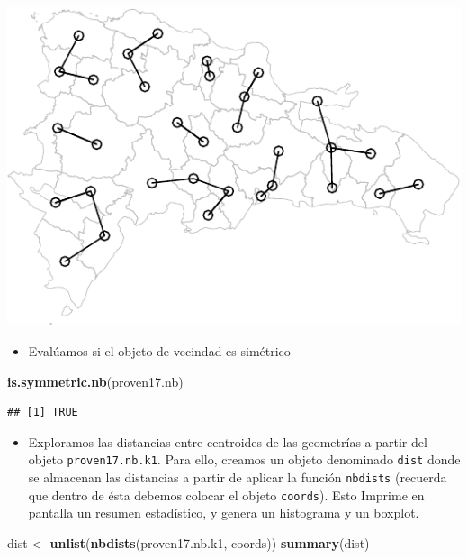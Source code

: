 \documentclass[11pt,]{article}
\newenvironment{Shaded}{\begin{snugshade}}{\end{snugshade}}
\newcommand{\KeywordTok}[1]{\textcolor[rgb]{0.13,0.29,0.53}{\textbf{#1}}}
\newcommand{\StringTok}[1]{\textcolor[rgb]{0.31,0.60,0.02}{#1}}
\newcommand{\NormalTok}[1]{#1}
\providecommand{\tightlist}{%
\setlength{\itemsep}{0pt}\setlength{\parskip}{0pt}}
\begin{document}
\includegraphics{proyecto_files/figure-latex/unnamed-chunk-14-1.pdf}

\begin{itemize}
\tightlist
\item
  Evalúamos si el objeto de vecindad es simétrico
\end{itemize}

\begin{Shaded}
\begin{Highlighting}[]
\KeywordTok{is.symmetric.nb}\NormalTok{(proven17.nb)}
\end{Highlighting}
\end{Shaded}

\begin{verbatim}
## [1] TRUE
\end{verbatim}

\begin{itemize}
\tightlist
\item
  Exploramos las distancias entre centroides de las geometrías a partir
  del objeto \texttt{proven17.nb.k1}. Para ello, creamos un objeto
  denominado \texttt{dist} donde se almacenan las distancias a partir de
  aplicar la función \texttt{nbdists} (recuerda que dentro de ésta
  debemos colocar el objeto \texttt{coords}). Esto Imprime en pantalla
  un resumen estadístico, y genera un histograma y un boxplot.
\end{itemize}

\begin{Shaded}
\begin{Highlighting}[]
\NormalTok{dist <-}\StringTok{ }\KeywordTok{unlist}\NormalTok{(}\KeywordTok{nbdists}\NormalTok{(proven17.nb.k1, coords))}
\KeywordTok{summary}\NormalTok{(dist)}
\end{Highlighting}
\end{Shaded}
\end{document}
